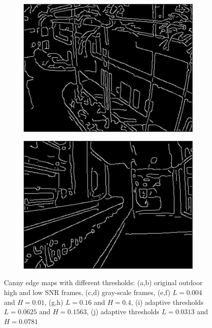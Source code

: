 \begin{figure}
\begin{subfigure}{0.49\columnwidth}
      \includegraphics[width=1.00\textwidth]{media/V_E_highsnradapcanny.jpg}
      	\caption{}
  		\label{fig:edgeprocessing_9}
  \end{subfigure}
  	\begin{subfigure}{0.49\columnwidth}
      \centering
      \includegraphics[width=1.00\textwidth]{media/V_E_lowsnradapcanny.jpg}
  		\caption{}
  		\label{fig:edgeprocessing_10}
    \end{subfigure}
  
\caption{Canny edge maps with different thresholds: (a,b) original outdoor high and low SNR frames, (c,d) gray-scale frames, (e,f) $L=0.004$ and $H=0.01$, (g,h) $L=0.16$ and $H=0.4$, (i) adaptive thresholds  $L=0.0625$ and $H=0.1563$, (j) adaptive thresholds $L=0.0313$ and $H=0.0781$}
\label{fig:edgeprocessing}
\end{figure}


